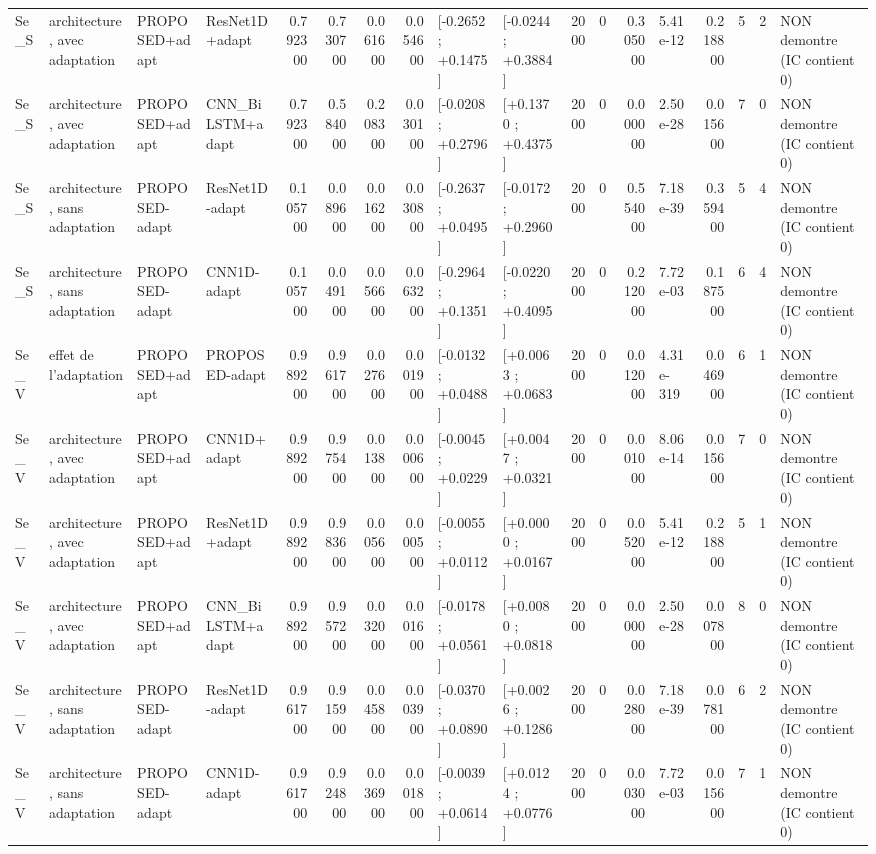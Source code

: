 \begin{tabular}{llllrrrrllrrrlrrrl}
Se_S & architecture, avec adaptation & PROPOSED+adapt & ResNet1D+adapt & 0.792300 & 0.730700 & 0.061600 & 0.054600 & [-0.2652 ; +0.1475] & [-0.0244 ; +0.3884] & 2000 & 0 & 0.305000 & 5.41e-12 & 0.218800 & 5 & 2 & NON demontre (IC contient 0) \\
Se_S & architecture, avec adaptation & PROPOSED+adapt & CNN_BiLSTM+adapt & 0.792300 & 0.584000 & 0.208300 & 0.030100 & [-0.0208 ; +0.2796] & [+0.1370 ; +0.4375] & 2000 & 0 & 0.000000 & 2.50e-28 & 0.015600 & 7 & 0 & NON demontre (IC contient 0) \\
Se_S & architecture, sans adaptation & PROPOSED-adapt & ResNet1D-adapt & 0.105700 & 0.089600 & 0.016200 & 0.030800 & [-0.2637 ; +0.0495] & [-0.0172 ; +0.2960] & 2000 & 0 & 0.554000 & 7.18e-39 & 0.359400 & 5 & 4 & NON demontre (IC contient 0) \\
Se_S & architecture, sans adaptation & PROPOSED-adapt & CNN1D-adapt & 0.105700 & 0.049100 & 0.056600 & 0.063200 & [-0.2964 ; +0.1351] & [-0.0220 ; +0.4095] & 2000 & 0 & 0.212000 & 7.72e-03 & 0.187500 & 6 & 4 & NON demontre (IC contient 0) \\
Se_V & effet de l'adaptation & PROPOSED+adapt & PROPOSED-adapt & 0.989200 & 0.961700 & 0.027600 & 0.001900 & [-0.0132 ; +0.0488] & [+0.0063 ; +0.0683] & 2000 & 0 & 0.012000 & 4.31e-319 & 0.046900 & 6 & 1 & NON demontre (IC contient 0) \\
Se_V & architecture, avec adaptation & PROPOSED+adapt & CNN1D+adapt & 0.989200 & 0.975400 & 0.013800 & 0.000600 & [-0.0045 ; +0.0229] & [+0.0047 ; +0.0321] & 2000 & 0 & 0.001000 & 8.06e-14 & 0.015600 & 7 & 0 & NON demontre (IC contient 0) \\
Se_V & architecture, avec adaptation & PROPOSED+adapt & ResNet1D+adapt & 0.989200 & 0.983600 & 0.005600 & 0.000500 & [-0.0055 ; +0.0112] & [+0.0000 ; +0.0167] & 2000 & 0 & 0.052000 & 5.41e-12 & 0.218800 & 5 & 1 & NON demontre (IC contient 0) \\
Se_V & architecture, avec adaptation & PROPOSED+adapt & CNN_BiLSTM+adapt & 0.989200 & 0.957200 & 0.032000 & 0.001600 & [-0.0178 ; +0.0561] & [+0.0080 ; +0.0818] & 2000 & 0 & 0.000000 & 2.50e-28 & 0.007800 & 8 & 0 & NON demontre (IC contient 0) \\
Se_V & architecture, sans adaptation & PROPOSED-adapt & ResNet1D-adapt & 0.961700 & 0.915900 & 0.045800 & 0.003900 & [-0.0370 ; +0.0890] & [+0.0026 ; +0.1286] & 2000 & 0 & 0.028000 & 7.18e-39 & 0.078100 & 6 & 2 & NON demontre (IC contient 0) \\
Se_V & architecture, sans adaptation & PROPOSED-adapt & CNN1D-adapt & 0.961700 & 0.924800 & 0.036900 & 0.001800 & [-0.0039 ; +0.0614] & [+0.0124 ; +0.0776] & 2000 & 0 & 0.003000 & 7.72e-03 & 0.015600 & 7 & 1 & NON demontre (IC contient 0) \\
\bottomrule
\end{tabular}
